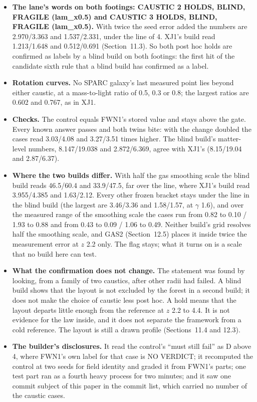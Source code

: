 \documentclass[10pt]{article}
\begin{document}
\begin{itemize}
\item \textbf{The lane's words on both footings: CAUSTIC 2 HOLDS, BLIND, FRAGILE (lam\_x0.5) and CAUSTIC 3 HOLDS, BLIND, FRAGILE (lam\_x0.5).} With twice the seed error added the numbers are 2.970/3.363 and 1.537/2.331, under the line of 4. XJ1's build read 1.213/1.648 and 0.512/0.691 (Section~11.3). So both post hoc holds are confirmed as labels by a blind build on both footings: the first hit of the candidate sixth rule that a blind build has confirmed as a label.
\item \textbf{Rotation curves.} No SPARC galaxy's last measured point lies beyond either caustic, at a mass-to-light ratio of 0.5, 0.3 or 0.8; the largest ratios are 0.602 and 0.767, as in XJ1.
\item \textbf{Checks.} The control equals FWN1's stored value and stays above the gate. Every known answer passes and both twins bite: with the change doubled the cases read 3.03/4.08 and 3.27/3.51 times higher. The blind build's matter-level numbers, 8.147/19.038 and 2.872/6.369, agree with XJ1's (8.15/19.04 and 2.87/6.37).
\item \textbf{Where the two builds differ.} With half the gas smoothing scale the blind build reads 46.5/60.4 and 33.9/47.5, far over the line, where XJ1's build read 3.955/4.385 and 1.63/2.12. Every other frozen bracket stays under the line in the blind build (the largest are 3.46/3.36 and 1.58/1.57, at $\gamma$ 1.6), and over the measured range of the smoothing scale the cases run from 0.82 to 0.10 / 1.93 to 0.88 and from 0.43 to 0.09 / 1.06 to 0.49. Neither build's grid resolves half the smoothing scale, and GAS2 (Section~12.5) places it inside twice the measurement error at $z$ 2.2 only. The flag stays; what it turns on is a scale that no build here can test.
\item \textbf{What the confirmation does not change.} The statement was found by looking, from a family of two caustics, after other radii had failed. A blind build shows that the layout is not excluded by the forest in a second build; it does not make the choice of caustic less post hoc. A hold means that the layout departs little enough from the reference at $z$ 2.2 to 4.4. It is not evidence for the law inside, and it does not separate the framework from a cold reference. The layout is still a drawn profile (Sections~11.4 and 12.3).
\item \textbf{The builder's disclosures.} It read the control's ``must still fail'' as D above 4, where FWN1's own label for that case is NO VERDICT; it recomputed the control at two seeds for field identity and graded it from FWN1's parts; one test part ran as a fourth heavy process for two minutes; and it saw one commit subject of this paper in the commit list, which carried no number of the caustic cases.
\end{itemize}
\end{document}
